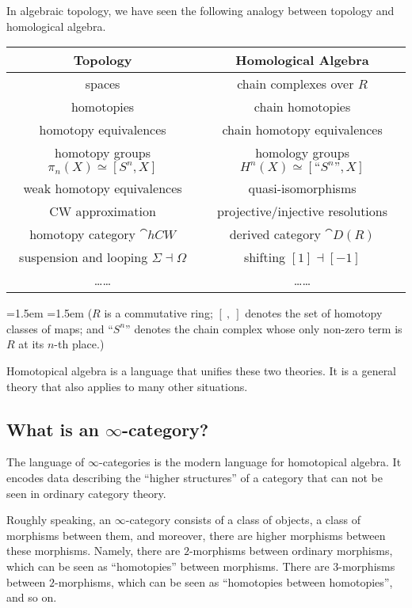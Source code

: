 In algebraic topology,
we have seen the following analogy between topology and homological algebra.

\begin{center}
    \begin{tabular}{cc}
        \textbf{Topology} & \textbf{Homological Algebra} \\\hline
        spaces & chain complexes over $R$ \\
        homotopies & chain homotopies \\
        homotopy equivalences & chain homotopy equivalences \\
        homotopy groups $\pi_n(X)\simeq[S^n,X]$ & homology groups $H^n(X)\simeq[\text{``}S^n\text{''},X]$ \\
        weak homotopy equivalences & quasi-isomorphisms \\
        CW approximation & projective/injective resolutions \\
        homotopy category $\cat{hCW}$ & derived category $\cat{D}(R)$ \\
        suspension and looping $\Sigma\dashv\Omega$ & shifting $[1]\dashv[-1]$ \\
        \dots\dots & \dots\dots
    \end{tabular}%
    \medskip

    {\leftskip=1.5em \rightskip=1.5em \small
    ($R$ is a commutative ring;
    $[\ ,\ ]$ denotes the set of homotopy classes of maps;
    and ``$S^n$'' denotes the chain complex
    whose only non-zero term is $R$ at its $n$-th place.)

    }
\end{center}

Homotopical algebra is a language that unifies these two theories.
It is a general theory that also applies to many other situations.

\subsection{What is an \texorpdfstring{$\infty$}{∞}-category?}

The language of $\infty$-categories is the modern language for homotopical algebra.
It encodes data describing the ``higher structures'' of a category
that can not be seen in ordinary category theory.

Roughly speaking, an $\infty$-category consists of a class of objects,
a class of morphisms between them,
and moreover, there are higher morphisms between these morphisms.
Namely, there are $2$-morphisms between ordinary morphisms,
which can be seen as ``homotopies'' between morphisms.
There are $3$-morphisms between $2$-morphisms,
which can be seen as ``homotopies between homotopies'', and so on.

